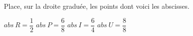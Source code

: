 %
%
Place, sur la droite graduée, les points dont voici les abscisses.
  \begin{tasks}
    \task $abs~R = \dfrac{1}{2}$
    \task $abs~P = \dfrac{6}{8}$
    \task $abs~I = \dfrac{6}{4}$
    \task $abs~U = \dfrac{8}{8}$
  \end{tasks}

